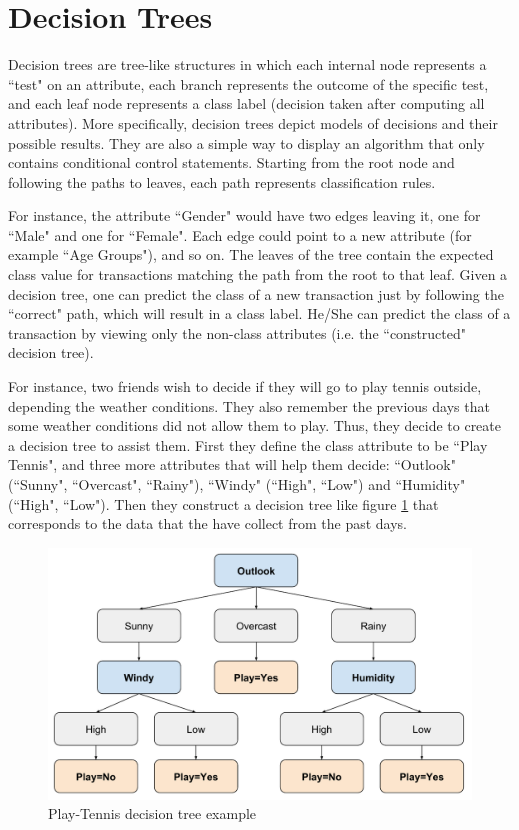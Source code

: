 \section{Decision Trees}\label{s:decision-trees}

Decision trees are tree-like structures in which each internal node represents a ``test" on an attribute, each branch represents the outcome of the specific test, and each leaf node represents a class label (decision taken after computing all attributes).
More specifically, decision trees depict models of decisions and their possible results.
They are also a simple way to display an algorithm that only contains conditional control statements.
Starting from the root node and following the paths to leaves, each path represents classification rules.

For instance, the attribute ``Gender" would have two edges leaving it, one for ``Male" and
one for ``Female".
Each edge could point to a new attribute (for example ``Age Groups"), and so on.
The leaves of the tree contain the expected class value for transactions matching the path from the root to that leaf.
Given a decision tree, one can predict the class of a new transaction just by following the ``correct" path, which will result in a class label.
He/She can predict the class of a transaction by viewing only the non-class attributes (i.e. the ``constructed" decision tree).

For instance, two friends wish to decide if they will go to play tennis outside, depending the weather conditions.
They also remember the previous days that some weather conditions did not allow them to play.
Thus, they decide to create a decision tree to assist them.
First they define the class attribute to be ``Play Tennis", and three more attributes that will help them decide: ``Outlook" (``Sunny", ``Overcast", ``Rainy"), ``Windy" (``High", ``Low") and ``Humidity" (``High", ``Low").
Then they construct a decision tree like figure \ref{f:outlook} that corresponds to the data that the have collect from the past days.

\begin{figure}[t]
  \centering
  \includegraphics[width=0.8\linewidth]{figures/outlook.pdf}
  \caption{Play-Tennis decision tree example}\label{f:outlook}
\end{figure}

